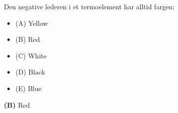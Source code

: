 

Den negative lederen i et termoelement har alltid fargen:

\begin{itemize}
\item{(A)} Yellow
\vskip 5pt 
\item{(B)} Red
\vskip 5pt 
\item{(C)} White
\vskip 5pt 
\item{(D)} Black
\vskip 5pt 
\item{(E)} Blue
\end{itemize}







{\bf (B)} Red
 









